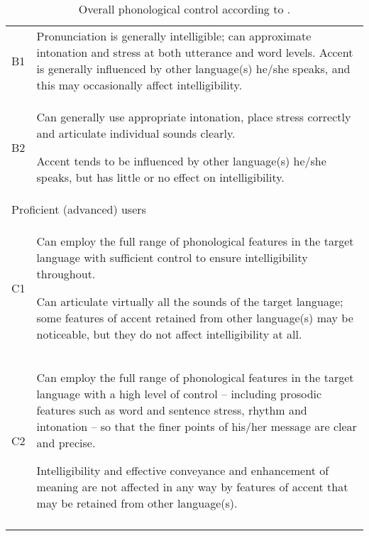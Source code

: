 \begin{table}
	\caption{Overall phonological control according to \citealt{CEFR2018}.}
	\label{tab:2.3a}
	\begin{tabularx}{\textwidth}{lX}
		\lsptoprule
		\multicolumn{2}{l}{{Independent (intermediate) users}}\\\midrule
		{B1} & Pronunciation is generally intelligible; can approximate intonation and stress at both utterance and word levels. Accent is generally influenced by other language(s) he/she speaks, and this may occasionally affect intelligibility.\\
		{B2} & Can generally use appropriate intonation, place stress correctly and articulate individual sounds clearly.
		
		Accent tends to be influenced by other language(s) he\slash she speaks, but has little or no effect on intelligibility.\\\midrule
		\multicolumn{2}{l}{{Proficient (advanced) users}}\\\midrule
		{C1} & Can employ the full range of phonological features in the target language with sufficient control to ensure intelligibility throughout.
		
		Can articulate virtually all the sounds of the target language; some features of accent retained from other language(s) may be noticeable, but they do not affect intelligibility at all.\\
		{C2} & Can employ the full range of phonological features in the target language with a high level of control -- including prosodic features such as word and sentence stress, rhythm and intonation -- so that the finer points of his/her message are clear and precise.
		
		Intelligibility and effective conveyance and enhancement of meaning are not affected in any way by features of accent that may be retained from other language(s).\\
		\lspbottomrule
	\end{tabularx}
\end{table}

